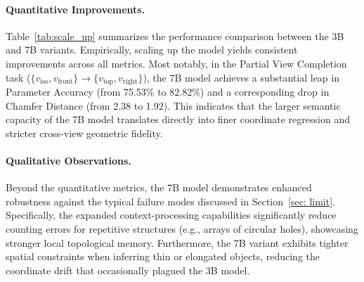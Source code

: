 \documentclass{article}
\begin{document}
\paragraph{Quantitative Improvements.} 
Table~\ref{tab:scale_up} summarizes the performance comparison between the 3B and 7B variants. Empirically, scaling up the model yields consistent improvements across all metrics. Most notably, in the Partial View Completion task ($\{v_{\text{iso}}, v_{\text{front}}\} \rightarrow \{v_{\text{top}}, v_{\text{right}}\}$), the 7B model achieves a substantial leap in Parameter Accuracy (from 75.53\% to 82.82\%) and a corresponding drop in Chamfer Distance (from 2.38 to 1.92). This indicates that the larger semantic capacity of the 7B model translates directly into finer coordinate regression and stricter cross-view geometric fidelity.

\begin{table}[htbp]
  \centering
  \caption{Quantitative comparison between 3B and 7B parameter models on Cross-View Translation and Partial View Completion tasks. CD is multiplied by $10^2$. \colorbox{red!20}{Red} and \colorbox{green!20}{green} cells denote the best and second-best results, respectively.}
  \label{tab:scale_up}
\end{table}

\paragraph{Qualitative Observations.} 
Beyond the quantitative metrics, the 7B model demonstrates enhanced robustness against the typical failure modes discussed in Section~\ref{sec: limit}. Specifically, the expanded context-processing capabilities significantly reduce counting errors for repetitive structures (e.g., arrays of circular holes), showcasing stronger local topological memory. Furthermore, the 7B variant exhibits tighter spatial constraints when inferring thin or elongated objects, reducing the coordinate drift that occasionally plagued the 3B model.
\end{document}
